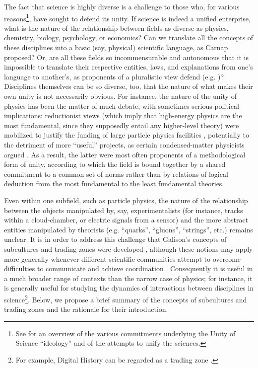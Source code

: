 \documentclass[smallextended]{svjour3}
\begin{document}
The fact that science is highly diverse is a challenge to those who, for various reasons\footnote{See \citealt{Hacking1996,Bechtel2007} for an overview of the various commitments underlying the Unity of Science ``ideology'' and of the attempts to unify the sciences.}, have sought to defend its unity. If science is indeed a unified enterprise, what is the nature of the relationship between fields as diverse as physics, chemistry, biology, psychology, or economics? Can we translate all the concepts of these disciplines into a basic (say, physical) scientific language, as Carnap proposed? Or, are all these fields so incommensurable and autonomous that it is impossible to translate their respective entities, laws, and explanations from one's language to another's, as proponents of a pluralistic view defend (e.g. \citet{Suppes1978,Dupre1983,Cartwright1999})? Disciplines themselves can be so diverse, too, that the nature of what makes their own unity is not necessarily obvious. For instance, the nature of the unity of physics has been the matter of much debate, with sometimes serious political implications: reductionist views (which imply that high-energy physics are the most fundamental, since they supposedly entail any higher-level theory) were mobilized to justify the funding of large particle physics facilities \citep{Cat1998}, potentially to the detriment of more ``useful'' projects, as certain condensed-matter physicists argued \citep{martin2018solid}. As a result, the latter were most often proponents of a methodological form of unity, according to which the field is bound together by a shared commitment to a common set of norms rather than by relations of logical deduction from the most fundamental to the least fundamental theories.

Even within one subfield, such as particle physics, the nature of the relationship between the objects manipulated by, say, experimentalists (for instance, tracks within a cloud-chamber, or electric signals from a sensor) and the more abstract entities manipulated by theorists (e.g. ``quarks'', ``gluons'', ``strings'', etc.) remains unclear. It is in order to address this challenge that Galison's concepts of subcultures and trading zones were developed \citep{galison1987how,galison1997image}, although these notions may apply more generally whenever different scientific communities attempt to overcome difficulties to communicate and achieve coordination \citep[p.~8]{Collins2010}. Consequently it is useful in a much broader range of contexts than the narrow case of physics; for instance, it is generally useful for studying the dynamics of interactions between disciplines in science\footnote{For example, Digital History can be regarded as a trading zone \citep{Kemman2021}.}. Below, we propose a brief summary of the concepts of subcultures and trading zones and the rationale for their introduction.
\end{document}
